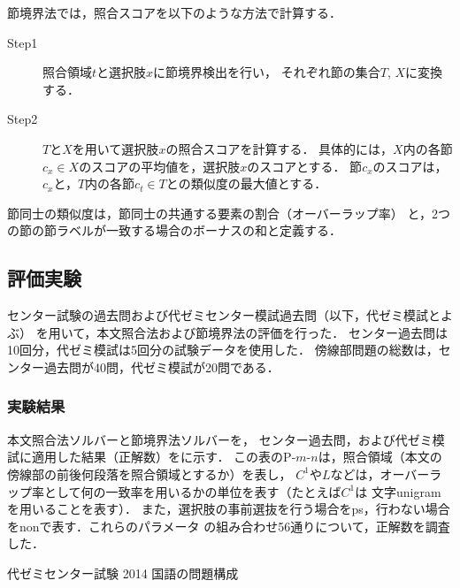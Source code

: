 \documentclass[japanese]{jnlp_1.4b}
\def\TABREF#1{}
\begin{document}
節境界法では，照合スコアを以下のような方法で計算する．
\begin{description}
\item[\textmd{Step1}] 照合領域$t$と選択肢$x$に節境界検出を行い，
  それぞれ節の集合$T$, $X$に変換する．
\item[\textmd{Step2}] $T$と$X$を用いて選択肢$x$の照合スコアを計算する．
  具体的には，$X$内の各節$c_x \in X$のスコアの平均値を，選択肢$x$のスコアとする．
  節$c_x$のスコアは，$c_x$と，$T$内の各節$c_t \in T$との類似度の最大値とする．
\end{description}

節同士の類似度は，節同士の共通する要素の割合（オーバーラップ率\cite{Hattori2013}）
と，2つの節の節ラベルが一致する場合のボーナスの和と定義する．


\subsection{評価実験}

センター試験の過去問および代ゼミセンター模試過去問（以下，代ゼミ模試とよぶ）
を用いて，本文照合法および節境界法の評価を行った．
センター過去問は10回分，代ゼミ模試は5回分の試験データを使用した．
傍線部問題の総数は，センター過去問が40問，代ゼミ模試が20問である．


\subsubsection{実験結果}

本文照合法ソルバーと節境界法ソルバーを，
センター過去問，および代ゼミ模試に適用した結果（正解数）を\TABREF{tab:kokugo:result}に示す．
この表のP-$m$-$n$は，照合領域（本文の傍線部の前後何段落を照合領域とするか）を表し，
$C^1$や$L$などは，オーバーラップ率として何の一致率を用いるかの単位を表す（たとえば$C^1$は
文字unigramを用いることを表す）．
また，選択肢の事前選抜を行う場合をps，行わない場合をnonで表す．これらのパラメータ
の組み合わせ56通りについて，正解数を調査した．

\begin{table}[b]
\caption{代ゼミセンター試験 2014 国語の問題構成}
\label{tab:kokugo:mondai}

\end{table}
\begin{table}[b]
\label{tab:kokugo:result}

\end{table}
\end{document}

